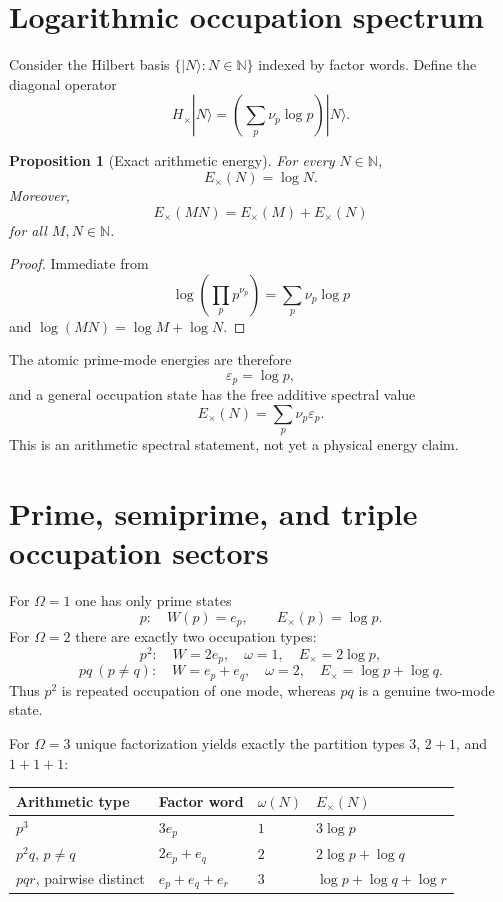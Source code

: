 \documentclass[11pt,a4paper]{article}
\newtheorem{proposition}[theorem]{Proposition}
\theoremstyle{definition}
\theoremstyle{remark}
\newcommand{\NN}{\mathbb N}
\begin{document}
\section{Logarithmic occupation spectrum}
Consider the Hilbert basis $\{|N\rangle:N\in\NN\}$ indexed by factor words. Define the diagonal operator
\begin{equation}
H_\times|N\rangle
=\left(\sum_p\nu_p\log p\right)|N\rangle.
\end{equation}

\begin{proposition}[Exact arithmetic energy]
For every $N\in\NN$,
\[
E_\times(N)=\log N.
\]
Moreover,
\[
E_\times(MN)=E_\times(M)+E_\times(N)
\]
for all $M,N\in\NN$.
\end{proposition}

\begin{proof}
Immediate from
\[
\log\left(\prod_pp^{\nu_p}\right)=\sum_p\nu_p\log p
\]
and $\log(MN)=\log M+\log N$.
\end{proof}

The atomic prime-mode energies are therefore
\[
\varepsilon_p=\log p,
\]
and a general occupation state has the free additive spectral value
\[
E_\times(N)=\sum_p\nu_p\varepsilon_p.
\]
This is an arithmetic spectral statement, not yet a physical energy claim.

\section{Prime, semiprime, and triple occupation sectors}
For $\Omega=1$ one has only prime states
\[
p:\quad W(p)=e_p,\qquad E_\times(p)=\log p.
\]
For $\Omega=2$ there are exactly two occupation types:
\[
p^2:\quad W=2e_p,\quad \omega=1,\quad E_\times=2\log p,
\]
\[
pq\ (p\ne q):\quad W=e_p+e_q,\quad \omega=2,\quad E_\times=\log p+\log q.
\]
Thus $p^2$ is repeated occupation of one mode, whereas $pq$ is a genuine two-mode state.

For $\Omega=3$ unique factorization yields exactly the partition types $3$, $2+1$, and $1+1+1$:
\begin{center}
\begin{tabular}{@{}llll@{}}
\toprule
Arithmetic type & Factor word & $\omega(N)$ & $E_\times(N)$ \\
\midrule
$p^3$ & $3e_p$ & $1$ & $3\log p$ \\
$p^2q$, $p\ne q$ & $2e_p+e_q$ & $2$ & $2\log p+\log q$ \\
$pqr$, pairwise distinct & $e_p+e_q+e_r$ & $3$ & $\log p+\log q+\log r$ \\
\bottomrule
\end{tabular}
\end{center}
\end{document}
